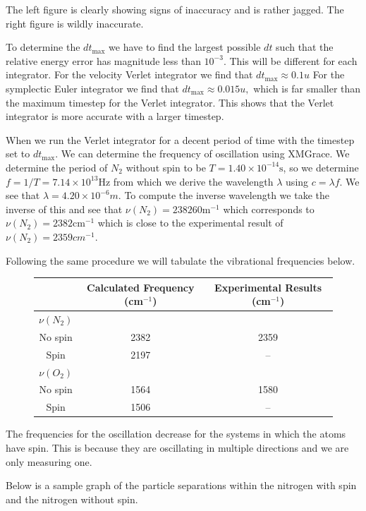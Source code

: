 \documentclass[12pt]{article}
\begin{document}
	The left figure is clearly showing signs of inaccuracy and is rather jagged. The right figure is wildly inaccurate.
	
	To determine the $dt_{\text{max}}$ we have to find the largest possible $dt$ such that the relative energy error has magnitude less than $10^{-3}$. This will be different for each integrator. For the velocity Verlet integrator we find that $dt_{\text{max}} \approx 0.1u $ For the symplectic Euler integrator we find that $dt_{\text{max}} \approx 0.015u,$ which is far smaller than the maximum timestep for the Verlet integrator. This shows that the Verlet integrator is more accurate with a larger timestep. 
	
When we run the Verlet integrator for a decent period of time with the timestep set to $dt_{\text{max}}$. We can determine the frequency of oscillation using XMGrace. We determine the period of $N_2$ without spin to be $T = 1.40\times 10^{-14}\text{s}$, so we determine $f = 1/T = 7.14\times 10^{13}\text{Hz}$ from which we derive the wavelength $\lambda$ using $c=\lambda f$. We see that $\lambda = 4.20\times10^{-6}m.$ To compute the inverse wavelength we take the inverse of this and see that $\nu(N_2) = 238260\text{m}^{-1}$ which corresponds to $\nu(N_2) = 2382\text{cm}^{-1}$ which is close to the experimental result of $\nu(N_2)= 2359cm^{-1}.$

Following the same procedure we will tabulate the vibrational frequencies below.

\begin{figure}[H]
\centering
\begin{tabular}{c|cc}
& Calculated Frequency (cm$^{-1}$) & Experimental Results (cm$^{-1}$)\\
\hline
$\nu(N_2)$ & & \\
No spin & 2382 & 2359\\
Spin & 2197 & --\\
\hline
$\nu(O_2)$ & & \\
No spin & 1564 & 1580 \\
Spin & 1506 & --\\
\end{tabular}
\end{figure}

The frequencies for the oscillation decrease for the systems in which the atoms have spin. This is because they are oscillating in multiple directions and we are only measuring one.

Below is a sample graph of the particle separations within the nitrogen with spin and the nitrogen without spin. 
\end{document}

